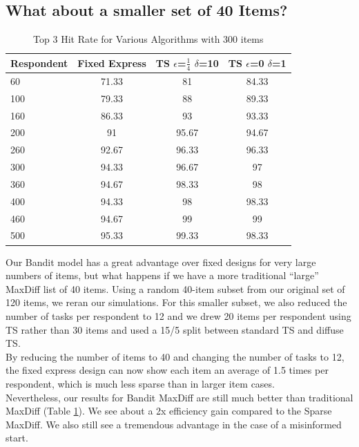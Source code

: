 \documentclass[mksc,blindrev]{informs3} %
\begin{document}
\subsection{What about a smaller set of 40 Items?}
\begin{table}
\begin{center}
\begin{tabular}{l | c | c | c}
 Respondent& Fixed Express &  TS $\epsilon$=$\frac{1}{4}$ $\delta$=10  &TS $\epsilon$=0 $\delta$=1 \\
\hline
60	&	71.33	&	81	&	84.33	\\
100	&	79.33	&	88	&	89.33\\
160	&	86.33	&	93	&	93.33	\\
200	&	91	&	95.67	&	94.67	\\
260	&	92.67	&	96.33	&	96.33	\\
300	&	94.33	&	96.67	&	97	\\
360	&	94.67	&	98.33	&	98	\\
400	&	94.33	&	98	&	98.33	\\
460	&	94.67	&	99	&	99	\\
500	&	95.33	&	99.33	&	98.33	\\
\hline
\end{tabular}
\end{center}
\caption{Top 3 Hit Rate for Various Algorithms with 300 items}
\label{table:40top3}
\end{table}
Our Bandit model has a great advantage over fixed designs for very large numbers of items, but what happens if we have a more traditional “large” MaxDiff list of 40 items. Using a random 40-item subset from our original set of 120 items, we reran our simulations. For this smaller subset, we also reduced the number of tasks per respondent to 12 and we drew 20 items per respondent using TS rather than 30 items and used a 15/5 split between standard TS and diffuse TS.\\
By reducing the number of items to 40 and changing the number of tasks to 12, the fixed express design can now show each item an average of 1.5 times per respondent, which is much less sparse than in larger item cases.\\
Nevertheless, our results for Bandit MaxDiff are still much better than traditional MaxDiff (Table \ref{table:40top3}). We see about a 2x efficiency gain compared to the Sparse MaxDiff. We also still see a tremendous advantage in the case of a misinformed start.\\
\end{document}
